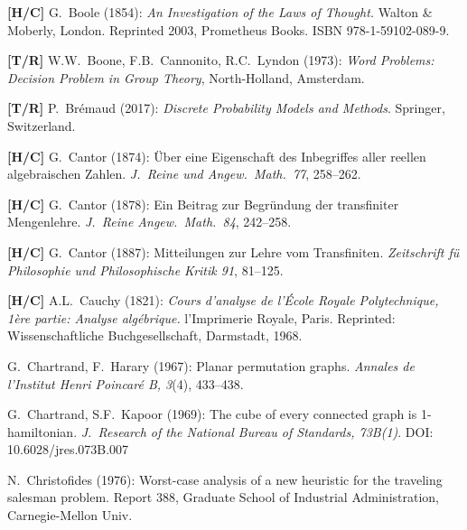 \begin{thebibliography}{999}

{\bf [H/C]}
G.~Boole (1854):
{\it An Investigation of the Laws of Thought.}  
Walton \& Moberly, London.  Reprinted 2003, Prometheus Books. ISBN
978-1-59102-089-9.

{\bf [T/R]}
W.W.~Boone, F.B.~Cannonito, R.C.~Lyndon (1973):
{\it Word Problems: Decision Problem in Group Theory}, North-Holland, Amsterdam.

{\bf [T/R]}
P.~Br\' emaud (2017):
{\it Discrete Probability Models and Methods}.  Springer, Switzerland.



{\bf [H/C]}
G.~Cantor (1874): \"{U}ber eine Eigenschaft des Inbegriffes aller
reellen algebraischen Zahlen.  {\it J.~Reine und Angew.~Math.~77}, 258--262.

{\bf [H/C]}
G.~Cantor (1878): Ein Beitrag zur Begr\"{u}ndung der transfiniter
Mengenlehre.  {\it J.~Reine Angew.~Math.~84}, 242--258.

{\bf [H/C]}
G.~Cantor (1887): Mitteilungen zur Lehre vom Transfiniten.
{\it Zeitschrift f\"{u} Philosophie und Philosophische Kritik 91}, 81--125.

{\bf [H/C]}
A.L.~Cauchy (1821): {\it Cours d'analyse de l'\'{E}cole Royale
Polytechnique, 1\`{e}re partie: Analyse alg\'{e}brique.}
l'Imprimerie Royale, Paris.  Reprinted: Wissenschaftliche
Buchgesellschaft, Darmstadt, 1968.

G.~Chartrand, F.~Harary (1967): Planar permutation graphs.
{\it Annales de l'Institut Henri Poincar\'{e} B, 3}(4), 433--438.

G.~Chartrand, S.F.~Kapoor (1969):
The cube of every connected graph is 1-hamiltonian.
{\it J.~Research of the National Bureau of Standards, 73B(1)}.  DOI:
10.6028/jres.073B.007


N.~Christofides (1976):
Worst-case analysis of a new heuristic for the traveling salesman problem.  Report 388, Graduate School of Industrial Administration, Carnegie-Mellon Univ.


\end{thebibliography}

